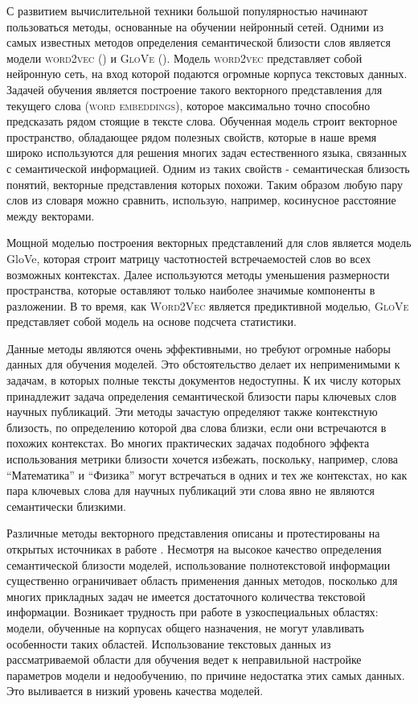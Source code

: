 С развитием вычислительной техники большой популярностью начинают пользоваться методы, основанные на обучении нейронный сетей. Одними из самых известных методов определения семантической близости слов является модели \textsc{word2vec} (\cite{word2vec}) и \textsc{GloVe} (\cite{glove}). Модель \textsc{word2vec} представляет собой нейронную сеть, на вход которой подаются огромные корпуса текстовых данных. Задачей обучения является построение такого векторного представления для текущего слова (\textsc{word embeddings}), которое максимально точно способно предсказать рядом стоящие в тексте слова. Обученная модель строит векторное пространство, обладающее рядом полезных свойств, которые в наше время широко используются для решения многих задач естественного языка, связанных с семантической информацией. Одним из таких свойств - семантическая близость понятий, векторные представления которых похожи. Таким образом любую пару слов из словаря можно сравнить, использую, например, косинусное расстояние между векторами.

Мощной моделью построения векторных представлений для слов является модель GloVe, которая строит матрицу частотностей встречаемостей слов во всех возможных контекстах. Далее используются методы уменьшения размерности пространства, которые оставляют только наиболее значимые компоненты в разложении. В то время, как \textsc{Word2Vec} является предиктивной моделью, \textsc{GloVe} представляет собой модель на основе подсчета статистики.

Данные методы являются очень эффективными, но требуют огромные наборы данных для обучения моделей. Это обстоятельство делает их неприменимыми к задачам, в которых полные тексты документов недоступны. К их числу которых принадлежит задача определения семантической близости пары ключевых слов научных публикаций. Эти методы зачастую определяют также контекстную близость, по определению которой два слова близки, если они встречаются в похожих контекстах. Во многих практических задачах подобного эффекта использования метрики близости хочется избежать, поскольку, например, слова “Математика” и “Физика” могут встречаться в одних и тех же контекстах, но как пара ключевых слова для научных публикаций эти слова явно не являются  семантически близкими.

Различные методы векторного представления описаны и протестированы на открытых источниках в работе \cite{embed_1}. Несмотря на высокое качество определения семантической близости моделей, использование полнотекстовой информации существенно ограничивает область применения данных методов, посколько для многих прикладных задач не имеется достаточного количества текстовой информации. Возникает трудность при работе в узкоспециальных областях: модели, обученные на корпусах общего назначения, не могут улавливать особенности таких областей. Использование текстовых данных из рассматриваемой области для обучения ведет к неправильной настройке параметров модели и недообучению, по причине недостатка этих самых данных. Это выливается в низкий уровень качества моделей. 

